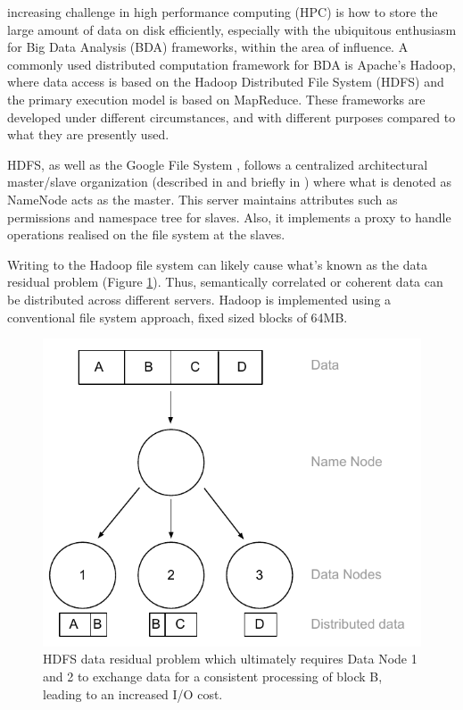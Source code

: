  increasing challenge in high performance computing (HPC) is how to store the large amount of data on disk efficiently, especially with the ubiquitous enthusiasm for Big Data Analysis (BDA) frameworks, within the area of influence. A commonly used distributed computation framework for BDA is Apache's Hadoop\cite{PageHadoop}, where data access is based on the Hadoop Distributed File System (HDFS) \cite{Shvachko:2010:HDF:1913798.1914427} and the primary execution model is based on MapReduce\cite{Dean:2008:MSD:1327452.1327492}. These frameworks are developed under different circumstances, and with different purposes compared to what they are presently used.
\newline

HDFS, as well as the Google File System \cite{Ghemawat:2003:GFS:945445.945450}, follows a centralized architectural master/slave organization (described in \cite{Tanenbaum:2006:DSP:1202502} and briefly in \cite{Wilkinson:1998:PPT:289352}) where what is denoted as NameNode acts as the master. This server maintains attributes such as permissions and namespace tree for slaves. Also, it implements a proxy to handle operations realised on the file system at the slaves. 
\newline

Writing to the Hadoop file system can likely cause what's known as the data residual problem (Figure \ref{fig:data-residual}). Thus, semantically correlated or coherent data can be distributed across different servers. Hadoop is implemented using a conventional file system approach, \ie fixed sized blocks of 64MB. 
\newpage

\begin{figure}
	\centering
	\hspace*{15mm}
	\includegraphics[scale=0.8]{pdf/data-residual.pdf}
	\caption[HDFS data residual problem]{HDFS data residual problem which ultimately requires Data Node 1 and 2 to exchange data for a consistent processing of block B, leading to an increased I/O cost. \label{fig:data-residual}}
\end{figure}


